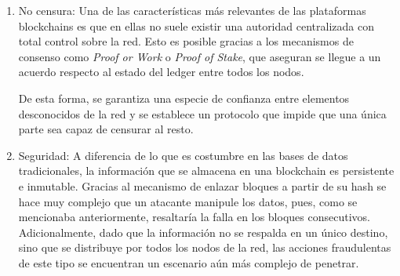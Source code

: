 \begin{enumerate}
	\item  No censura: Una de las caracter\'isticas m\'as relevantes de las plataformas blockchains es que en ellas no suele existir una autoridad centralizada con total control sobre la red. Esto es posible gracias a los mecanismos de consenso como \emph{Proof or Work} o \emph{Proof of Stake}, que aseguran se llegue a un acuerdo respecto al estado del ledger entre todos los nodos.
	
	
	
		
	De esta forma, se garantiza una especie de confianza entre elementos desconocidos de la red y se establece un protocolo que impide que una \'unica parte sea capaz de censurar al resto.
	
	
		
	\item Seguridad: A diferencia de lo que es costumbre en las bases de datos tradicionales, la informaci\'on que se almacena en una blockchain es persistente e inmutable. Gracias al mecanismo de enlazar bloques a partir de su hash se hace muy complejo que un atacante manipule los datos, pues, como se mencionaba anteriormente, resaltar\'ia la falla en los bloques consecutivos. Adicionalmente, dado que la informaci\'on no se respalda en un \'unico destino, sino que se distribuye por todos los nodos de la red, las acciones fraudulentas de este tipo se encuentran un escenario a\'un m\'as complejo de penetrar.
	

\end{enumerate}

